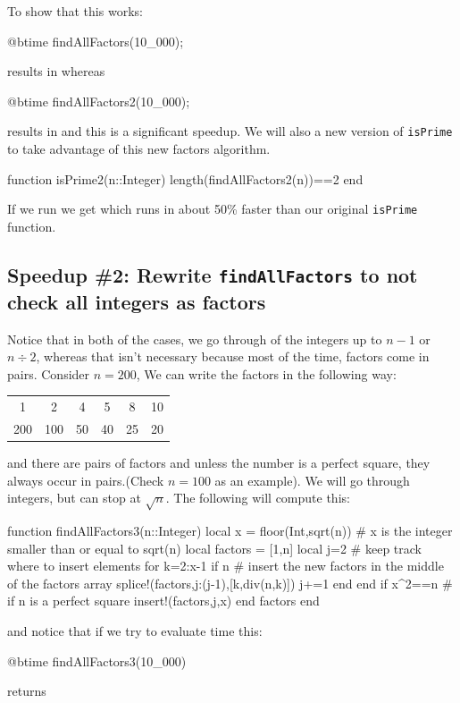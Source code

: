 To show that this works:
\begin{jlblock}[nt]
@btime findAllFactors(10_000);
\end{jlblock}
results in  
\printpythontex[verbatim] whereas 

\begin{jlblock}[nt]
@btime findAllFactors2(10_000);
\end{jlblock}
results in 
\printpythontex[verbatim] and this is a significant speedup.  We will also a new version of \texttt{isPrime} to take advantage of this new factors algorithm.  

\begin{jlblock}[nt]
function isPrime2(n::Integer)
  length(findAllFactors2(n))==2
end
\end{jlblock}

If we run  we get 
 \printpythontex[verbatim]
which runs in about 50\% faster than our original \texttt{isPrime} function.  

\subsection{Speedup \#2: Rewrite \texttt{findAllFactors} to not check all integers as factors}

Notice that in both of the cases, we go through of the integers up to $n-1$ or $n \div 2$, whereas that isn't necessary because most of the time, factors come in pairs.  Consider $n=200$, We can write the factors in the following way:

\begin{center}
\begin{tabular}{cccccc}
1 & 2 & 4 & 5 & 8 & 10 \\
200 & 100 & 50 &  40 & 25 & 20
\end{tabular}
\end{center}
%
and there are pairs of factors and unless the number is a perfect square, they always occur in pairs.(Check $n=100$ as an example).  We will go through integers, but can stop at $\sqrt{n}$.  The following will compute this:
\begin{jlblock}[nt][numbers=left]
function findAllFactors3(n::Integer)
  local x = floor(Int,sqrt(n)) # x is the integer smaller than or equal to sqrt(n)
  local factors = [1,n]
  local j=2 # keep track where to insert elements
  for k=2:x-1
    if n%
      # insert the new factors in the middle of the factors array
      splice!(factors,j:(j-1),[k,div(n,k)])
      j+=1
    end
  end
  if x^2==n # if n is a perfect square
    insert!(factors,j,x)
  end
  factors
end
\end{jlblock} 
%
and notice that if we try to evaluate time this:
\begin{jlblock}[nt]
@btime findAllFactors3(10_000)
\end{jlblock}
returns  \printpythontex[verbatim]

